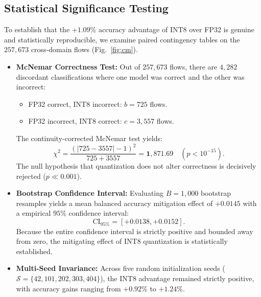 \subsection{Statistical Significance Testing}
To establish that the $+1.09\%$ accuracy advantage of INT8 over FP32 is genuine and statistically reproducible, we examine paired contingency tables on the $257,673$ cross-domain flows (Fig.~\ref{fig:cm}).
\begin{itemize}
    \item \textbf{McNemar Correctness Test:} Out of $257,673$ flows, there are $4,282$ discordant classifications where one model was correct and the other was incorrect:
    \begin{itemize}
        \item FP32 correct, INT8 incorrect: $b = 725$ flows.
        \item FP32 incorrect, INT8 correct: $c = 3,557$ flows.
    \end{itemize}
    The continuity-corrected McNemar test yields:
    \begin{equation}
    \chi^2 = \frac{(|725 - 3557| - 1)^2}{725 + 3557} = \mathbf{1,871.69} \quad (p < 10^{-15}).
    \end{equation}
    The null hypothesis that quantization does not alter correctness is decisively rejected ($p \ll 0.001$).
    \item \textbf{Bootstrap Confidence Interval:} Evaluating $B = 1,000$ bootstrap resamples yields a mean balanced accuracy mitigation effect of $+0.0145$ with a empirical $95\%$ confidence interval:
    \begin{equation}
    \text{CI}_{95\%} = \mathbf{[+0.0138, +0.0152]}.
    \end{equation}
    Because the entire confidence interval is strictly positive and bounded away from zero, the mitigating effect of INT8 quantization is statistically established.
    \item \textbf{Multi-Seed Invariance:} Across five random initialization seeds ($\mathcal{S} = \{42, 101, 202, 303, 404\}$), the INT8 advantage remained strictly positive, with accuracy gains ranging from $+0.92\%$ to $+1.24\%$.
\end{itemize}


